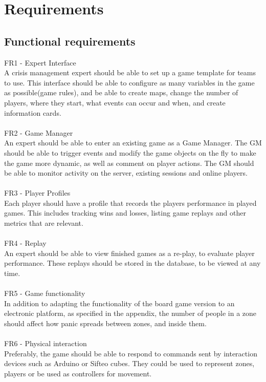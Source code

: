 \chapter{Requirements}
\section{Functional requirements}


FR1 - Expert Interface\\
A crisis management expert should be able to set up a game template for teams to use. This interface should be able to configure as many variables in the game as possible(game rules), and be able to create maps, change the number of players, where they start, what events can occur and when, and create information cards.\\
\\
FR2 - Game Manager\\
An expert should be able to enter an existing game as a Game Manager. The GM should be able to trigger events and modify the game objects on the fly to make the game more dynamic, as well as comment on player actions. The GM should be able to monitor activity on the server, existing sessions and online players.\\
\\
FR3 - Player Profiles\\
Each player should have a profile that records the players performance in played games. This includes tracking wins and losses, listing game replays and other metrics that are relevant.\\
\\
FR4 - Replay\\
An expert should be able to view finished games as a re-play, to evaluate player performance. These replays should be stored in the database, to be viewed at any time.\\
\\
FR5 - Game functionality\\
In addition to adapting the functionality of the board game version to an electronic platform, as specified in the appendix, the number of people in a zone should affect how panic spreads between zones, and inside them. \\
\\
FR6 - Physical interaction\\
Preferably, the game should be able to respond to commands sent by interaction devices such as Arduino or Sifteo cubes. They could be used to represent zones, players or be used as controllers for movement.\\
\\


